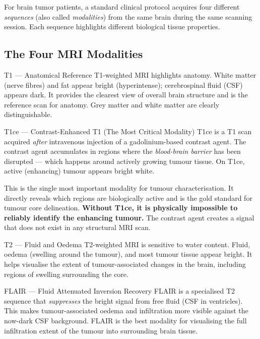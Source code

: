 \documentclass[12pt,a4paper]{article}
\begin{document}
For brain tumor patients, a standard clinical protocol acquires four different \emph{sequences} (also called \emph{modalities}) from the same brain during the same scanning session. Each sequence highlights different biological tissue properties.

\subsection{The Four MRI Modalities}

\begin{defbox}{T1 --- Anatomical Reference}
T1-weighted MRI highlights anatomy. White matter (nerve fibres) and fat appear bright (hyperintense); cerebrospinal fluid (CSF) appears dark. It provides the clearest view of overall brain structure and is the reference scan for anatomy. Grey matter and white matter are clearly distinguishable.
\end{defbox}

\begin{defbox}{T1ce --- Contrast-Enhanced T1 (The Most Critical Modality)}
T1ce is a T1 scan acquired \emph{after} intravenous injection of a gadolinium-based contrast agent. The contrast agent accumulates in regions where the \emph{blood-brain barrier} has been disrupted --- which happens around actively growing tumour tissue. On T1ce, active (enhancing) tumour appears bright white.

This is the single most important modality for tumour characterisation. It directly reveals which regions are biologically active and is the gold standard for tumour core delineation. \textbf{Without T1ce, it is physically impossible to reliably identify the enhancing tumour.} The contrast agent creates a signal that does not exist in any structural MRI scan.
\end{defbox}

\begin{defbox}{T2 --- Fluid and Oedema}
T2-weighted MRI is sensitive to water content. Fluid, oedema (swelling around the tumour), and most tumour tissue appear bright. It helps visualise the extent of tumour-associated changes in the brain, including regions of swelling surrounding the core.
\end{defbox}

\begin{defbox}{FLAIR --- Fluid Attenuated Inversion Recovery}
FLAIR is a specialised T2 sequence that \emph{suppresses} the bright signal from free fluid (CSF in ventricles). This makes tumour-associated oedema and infiltration more visible against the now-dark CSF background. FLAIR is the best modality for visualising the full infiltration extent of the tumour into surrounding brain tissue.
\end{defbox}
\end{document}
